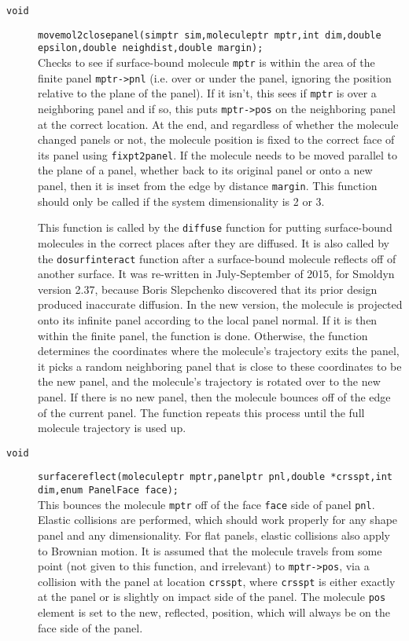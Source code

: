 \documentclass {book}
\newcommand {\ttt} {\texttt}
\begin{document}
\begin{description}
\item[\ttt{void}]
\ttt{movemol2closepanel(simptr sim,moleculeptr mptr,int dim,double epsilon,double neighdist,double margin);}
\hfill \\
Checks to see if surface-bound molecule \ttt{mptr} is within the area of the finite panel \ttt{mptr->pnl} (i.e. over or under the panel, ignoring the position relative to the plane of the panel). If it isn't, this sees if \ttt{mptr} is over a neighboring panel and if so, this puts \ttt{mptr->pos} on the neighboring panel at the correct location. At the end, and regardless of whether the molecule changed panels or not, the molecule position is fixed to the correct face of its panel using \ttt{fixpt2panel}. If the molecule needs to be moved parallel to the plane of a panel, whether back to its original panel or onto a new panel, then it is inset from the edge by distance \ttt{margin}. This function should only be called if the system dimensionality is 2 or 3.

This function is called by the \ttt{diffuse} function for putting surface-bound molecules in the correct places after they are diffused. It is also called by the \ttt{dosurfinteract} function after a surface-bound molecule reflects off of another surface. It was re-written in July-September of 2015, for Smoldyn version 2.37, because Boris Slepchenko discovered that its prior design produced inaccurate diffusion. In the new version, the molecule is projected onto its infinite panel according to the local panel normal. If it is then within the finite panel, the function is done. Otherwise, the function determines the coordinates where the molecule's trajectory exits the panel, it picks a random neighboring panel that is close to these coordinates to be the new panel, and the molecule's trajectory is rotated over to the new panel. If there is no new panel, then the molecule bounces off of the edge of the current panel. The function repeats this process until the full molecule trajectory is used up.

\item[\ttt{void}]
\ttt{surfacereflect(moleculeptr mptr,panelptr pnl,double *crsspt,int dim,enum PanelFace face);}
\hfill \\
This bounces the molecule \ttt{mptr} off of the face \ttt{face} side of panel \ttt{pnl}. Elastic collisions are performed, which should work properly for any shape panel and any dimensionality. For flat panels, elastic collisions also apply to Brownian motion. It is assumed that the molecule travels from some point (not given to this function, and irrelevant) to \ttt{mptr->pos}, via a collision with the panel at location \ttt{crsspt}, where \ttt{crsspt} is either exactly at the panel or is slightly on impact side of the panel. The molecule \ttt{pos} element is set to the new, reflected, position, which will always be on the face side of the panel.


\end{description}
\end{document}
